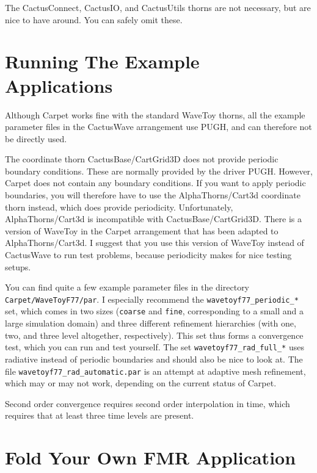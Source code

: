 The CactusConnect, CactusIO, and CactusUtils thorns are not necessary,
but are nice to have around.  You can safely omit these.



\section{Running The Example Applications}

Although Carpet works fine with the standard WaveToy thorns, all the
example parameter files in the CactusWave arrangement use PUGH, and
can therefore not be directly used.

The coordinate thorn CactusBase/CartGrid3D does not provide periodic
boundary conditions.  These are normally provided by the driver PUGH.
However, Carpet does not contain any boundary conditions.  If you want
to apply periodic boundaries, you will therefore have to use the
AlphaThorns/Cart3d coordinate thorn instead, which does provide
periodicity.  Unfortunately, AlphaThorns/Cart3d is incompatible with
CactusBase/CartGrid3D.  There is a version of WaveToy in the Carpet
arrangement that has been adapted to AlphaThorns/Cart3d.  I suggest
that you use this version of WaveToy instead of CactusWave to run test
problems, because periodicity makes for nice testing setups.

You can find quite a few example parameter files in the directory
\texttt{Carpet/WaveToyF77/par}.  I especially recommend the
\texttt{wavetoyf77\_periodic\_*} set, which comes in two sizes
(\texttt{coarse} and \texttt{fine}, corresponding to a small and a
large simulation domain) and three different refinement hierarchies
(with one, two, and three level altogether, respectively).  This set
thus forms a convergence test, which you can run and test yourself.
The set \texttt{wavetoyf77\_rad\_full\_*} uses radiative instead of
periodic boundaries and should also be nice to look at.  The file
\texttt{wavetoyf77\_rad\_automatic.par} is an attempt at adaptive mesh
refinement, which may or may not work, depending on the current status
of Carpet.

Second order convergence requires second order interpolation in time,
which requires that at least three time levels are present.



\section{Fold Your Own FMR Application}

